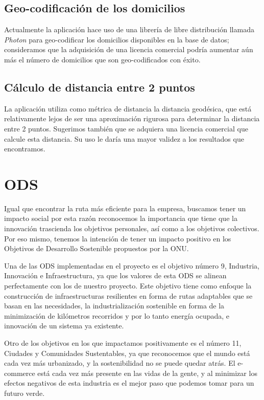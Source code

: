 \documentclass[journal]{IEEEtran}
\begin{document}
        \subsection{Geo-codificación de los domicilios}
            
            Actualmente la aplicación hace uso de una librería de libre distribución llamada \emph{Photon} para geo-codificar los domicilios disponibles en la base de datos; consideramos que la adquisición de una licencia comercial podría aumentar aún más el número de domicilios que son geo-codificados con éxito.
            
        \subsection{Cálculo de distancia entre 2 puntos}
            
            La aplicación utiliza como métrica de distancia la distancia geodésica, que está relativamente lejos de ser una aproximación rigurosa para determinar la distancia entre 2 puntos. Sugerimos también que se adquiera una licencia comercial que calcule esta distancia. Su uso le daría una mayor validez a los resultados que encontramos.
        
    \section{ODS}
    
        Igual que encontrar la ruta más eficiente para la empresa, buscamos tener un impacto social por esta razón reconocemos la importancia que tiene que la innovación trascienda los objetivos personales, así como a los objetivos colectivos. Por eso mismo, tenemos la intención de tener un impacto positivo en los Objetivos de Desarrollo Sostenible propuestos por la ONU. 
        
        Una de las ODS implementadas en el proyecto es el objetivo número 9,  Industria, Innovación e Infraestructura, ya que los valores de esta ODS se alinean perfectamente con los de nuestro proyecto. Este objetivo tiene como enfoque la construcción de infraestructuras resilientes en forma de rutas adaptables que se basan en las necesidades, la industrialización sostenible en forma de la minimización de kilómetros recorridos y por lo tanto energía ocupada, e innovación de un sistema ya existente. 
        
        Otro de los objetivos en los que impactamos positivamente es el número 11, Ciudades y Comunidades Sustentables, ya que reconocemos que el mundo está cada vez más urbanizado, y la sostenibilidad no se puede quedar atrás. El e-commerce está cada vez más presente en las vidas de la gente, y al minimizar los efectos negativos de esta industria es el mejor paso que podemos tomar para un futuro verde. 
\end{document}
